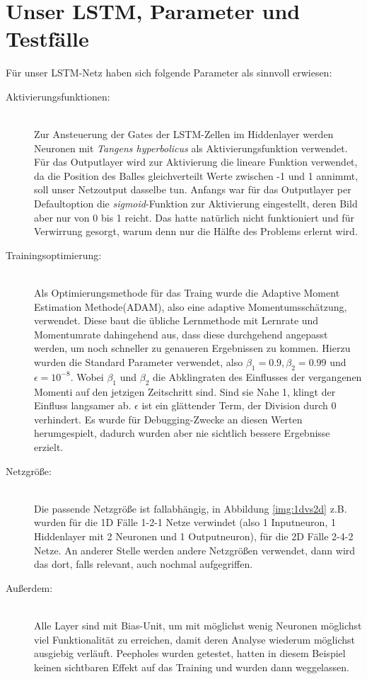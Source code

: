 \section{Unser LSTM, Parameter und Testfälle}
Für unser LSTM-Netz haben sich folgende Parameter als sinnvoll erwiesen:
\begin{description}	\item[Aktivierungsfunktionen:]\hfill \\ 
	Zur Ansteuerung der Gates der LSTM-Zellen im Hiddenlayer werden Neuronen mit \textit{Tangens hyperbolicus} als Aktivierungsfunktion verwendet. Für das Outputlayer wird zur Aktivierung die lineare Funktion verwendet, da die Position des Balles gleichverteilt Werte zwischen -1 und 1 annimmt, soll unser Netzoutput dasselbe tun. Anfangs war für das Outputlayer per Defaultoption die \textit{sigmoid}-Funktion zur Aktivierung eingestellt, deren Bild aber nur von 0 bis 1 reicht. Das hatte natürlich nicht funktioniert und für Verwirrung gesorgt, warum denn nur die Hälfte des Problems erlernt wird.  
	\item[Trainingsoptimierung:]\hfill \\ 
	Als Optimierungsmethode für das Traing wurde die Adaptive Moment Estimation Methode(ADAM), also eine adaptive Momentumsschätzung, verwendet. Diese baut die übliche Lernmethode mit Lernrate und Momentumrate dahingehend aus, dass diese durchgehend angepasst werden, um noch schneller zu genaueren Ergebnissen zu kommen. Hierzu wurden die Standard Parameter verwendet, also $ \beta_{1}=0.9, \beta_{2}=0.99 $ und $ \epsilon = 10^{-8}$. Wobei $ \beta_{1} $ und $ \beta_{2} $ die Abklingraten des Einflusses der vergangenen Momenti auf den jetzigen Zeitschritt sind. Sind sie Nahe 1, klingt der Einfluss langsamer ab. $ \epsilon$ ist ein glättender Term, der Division durch 0 verhindert. \cite{bib:adam} Es wurde für Debugging-Zwecke an diesen Werten herumgespielt, dadurch wurden aber nie sichtlich bessere Ergebnisse erzielt.
	\item[Netzgröße:]\hfill \\ 
	Die passende Netzgröße ist fallabhängig, in Abbildung \ref{img:1dvs2d} z.B. wurden für die 1D Fälle 1-2-1 Netze verwindet (also 1 Inputneuron, 1 Hiddenlayer mit 2 Neuronen und 1 Outputneuron), für die 2D Fälle 2-4-2 Netze. An anderer Stelle werden andere Netzgrößen verwendet, dann wird das dort, falls relevant, auch nochmal aufgegriffen.
	\item[Außerdem:]\hfill \\
	Alle Layer sind mit Bias-Unit, um mit möglichst wenig Neuronen möglichst viel Funktionalität zu erreichen, damit deren Analyse wiederum möglichst ausgiebig verläuft. Peepholes \cite{bib:lstm2} wurden getestet, hatten in diesem Beispiel keinen sichtbaren Effekt auf das Training und wurden dann weggelassen.  
\end{description}
